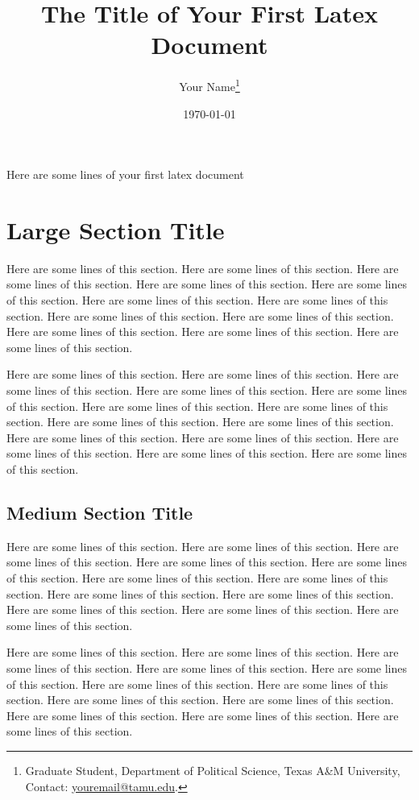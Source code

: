 \documentclass [12pt]{article}
\title{The Title of Your First Latex Document}
\author{Your Name\footnote{Graduate Student, Department of Political Science, Texas A\&M University, Contact: \href{youremail@tamu.edu}{youremail@tamu.edu}.}}
\date{{\normalsize \today}}
\begin{document}
\singlespace
\maketitle			%
\doublespace		%



\noindent Here are some lines of your first latex document

\section*{Large Section Title}
\noindent Here are some lines of this section. Here are some lines of this section. Here are some lines of this section. Here are some lines of this section. Here are some lines of this section. Here are some lines of this section. Here are some lines of this section. Here are some lines of this section. Here are some lines of this section. Here are some lines of this section. Here are some lines of this section. Here are some lines of this section. 

Here are some lines of this section. Here are some lines of this section. Here are some lines of this section. Here are some lines of this section. Here are some lines of this section. Here are some lines of this section. Here are some lines of this section. Here are some lines of this section. Here are some lines of this section. Here are some lines of this section. Here are some lines of this section. Here are some lines of this section. Here are some lines of this section. Here are some lines of this section. 

\subsection*{Medium Section Title}
\noindent Here are some lines of this section. Here are some lines of this section. Here are some lines of this section. Here are some lines of this section. Here are some lines of this section. Here are some lines of this section. Here are some lines of this section. Here are some lines of this section. Here are some lines of this section. Here are some lines of this section. Here are some lines of this section. Here are some lines of this section. 

Here are some lines of this section. Here are some lines of this section. Here are some lines of this section. Here are some lines of this section. Here are some lines of this section. Here are some lines of this section. Here are some lines of this section. Here are some lines of this section. Here are some lines of this section. Here are some lines of this section. Here are some lines of this section. Here are some lines of this section. 
\end{document}
